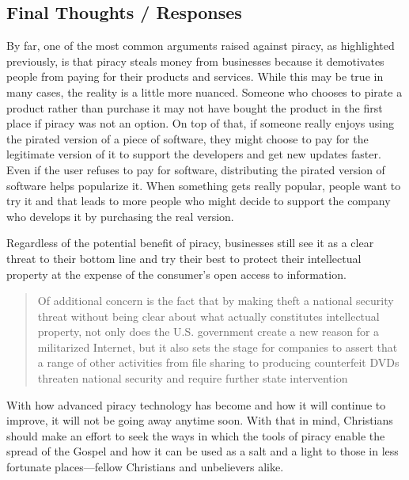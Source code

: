 \documentclass[onecolumn, 12pt]{article}
\begin{document}
\begin{refsection}
\subsection{Final Thoughts / Responses}
By far, one of the most common arguments raised against piracy, as highlighted previously,
is that piracy steals money from businesses because it demotivates people from paying for
their products and services. While this may be true in many cases, the reality is a little
more nuanced. Someone who chooses to pirate a product rather than purchase it may not have
bought the product in the first place if piracy was not an option. On top of that, if
someone really enjoys using the pirated version of a piece of software, they might choose
to pay for the legitimate version of it to support the developers and get new updates
faster. Even if the user refuses to pay for software, distributing the pirated version of
software helps popularize it. When something gets really popular, people want to try it
and that leads to more people who might decide to support the company who develops it by
purchasing the real version.

Regardless of the potential benefit of piracy, businesses still see it as a clear threat
to their bottom line and try their best to protect their intellectual property at the
expense of the consumer's open access to information.
\blockcquote[264]{halbert:agendas}[.]{%
  Of additional concern is the fact that by making
   theft a national security threat without being
  clear about what actually constitutes intellectual property, not only does the
  U.S. government create a new reason for a militarized Internet, but it also
  sets the stage for companies to assert that a range of other activities from
  file sharing to producing counterfeit DVDs threaten national security and
  require further state intervention%
}

With how advanced piracy technology has become and how it will continue to improve, it
will not be going away anytime soon. With that in mind, Christians should make an effort
to seek the ways in which the tools of piracy enable the spread of the Gospel and how it
can be used as a salt and a light to those in less fortunate places---fellow Christians
and unbelievers alike.

\clearpage
\printbibliography[title=References]
\end{refsection}

\clearpage
\nocite{*}
\printbibliography[title=Bibliography]
\end{document}
